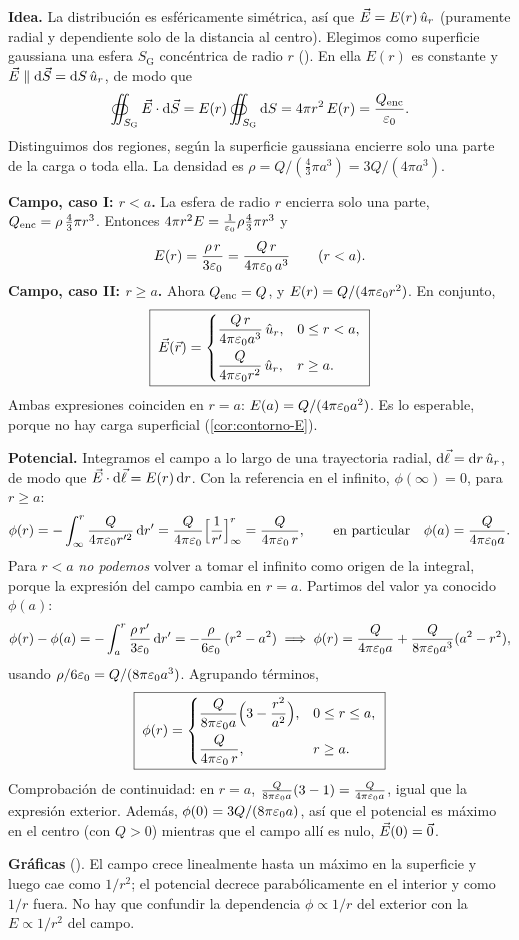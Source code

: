 \begin{resolucion}
\textbf{Idea.} La distribución es esféricamente simétrica, así que $\vec{E}=E(r)\,\hat{u}_{r}$ (puramente radial y dependiente solo de la distancia al centro). Elegimos como superficie gaussiana
una esfera $S_{\mathrm{G}}$ concéntrica de radio $r$ (). En ella $E(r)$ es constante y $\vec{E}\parallel\mathrm{d}\vec{S}=\mathrm{d} S\,\hat{u}_{r}$, de modo que
\[
  \oiint_{S_{\mathrm{G}}}\vec{E}\cdot\mathrm{d}\vec{S}=E(r)\oiint_{S_{\mathrm{G}}}\mathrm{d} S=4\pi r^{2}\,E(r)=\frac{Q_{\mathrm{enc}}}{\varepsilon_{0}}.
\]
Distinguimos dos regiones, según la superficie gaussiana encierre solo una parte de la carga o toda ella. La densidad es $\rho=Q/(\frac43\pi a^{3})=3Q/(4\pi a^{3})$.

\textbf{Campo, caso I: $r<a$.} La esfera de radio $r$ encierra solo una parte, $Q_{\mathrm{enc}}=\rho\,\tfrac43\pi r^{3}$. Entonces $4\pi r^{2}E=\frac{1}{\varepsilon_{0}}\rho\frac43\pi r^{3}$ y
\[
  E(r)=\frac{\rho\,r}{3\varepsilon_{0}}=\frac{Q\,r}{4\pi\varepsilon_{0}\,a^{3}}\qquad(r<a).
\]
\textbf{Campo, caso II: $r\ge a$.} Ahora $Q_{\mathrm{enc}}=Q$, y $E(r)=Q/(4\pi\varepsilon_{0} r^{2})$. En conjunto,
\[
  \boxed{\;\vec{E}(\vec{r})=\begin{cases}\dfrac{Q\,r}{4\pi\varepsilon_{0} a^{3}}\,\hat{u}_{r},&0\le r<a,\\[8pt]\dfrac{Q}{4\pi\varepsilon_{0} r^{2}}\,\hat{u}_{r},&r\ge a.\end{cases}\;}
\]
Ambas expresiones coinciden en $r=a$: $E(a)=Q/(4\pi\varepsilon_{0} a^{2})$. Es lo esperable, porque no hay carga superficial (\cref{cor:contorno-E}).

\textbf{Potencial.} Integramos el campo a lo largo de una trayectoria radial, $\mathrm{d}\vec{\ell}=\mathrm{d} r\,\hat{u}_{r}$, de modo que $\vec{E}\cdot\mathrm{d}\vec{\ell}=E(r)\,\mathrm{d} r$. Con la referencia en el infinito, $\phi(\infty)=0$,
para $r\ge a$:
\[
  \phi(r)=-\int_{\infty}^{r}\frac{Q}{4\pi\varepsilon_{0} r'^{2}}\,\mathrm{d} r'=\frac{Q}{4\pi\varepsilon_{0}}\Bigl[\frac{1}{r'}\Bigr]_{\infty}^{r}=\frac{Q}{4\pi\varepsilon_{0}\,r},\qquad\text{en particular}\quad\phi(a)=\frac{Q}{4\pi\varepsilon_{0} a}.
\]
Para $r<a$ \emph{no podemos} volver a tomar el infinito como origen de la integral, porque la expresión del campo cambia en $r=a$. Partimos del valor ya conocido $\phi(a)$:
\[
  \phi(r)-\phi(a)=-\int_{a}^{r}\frac{\rho\,r'}{3\varepsilon_{0}}\,\mathrm{d} r'=-\frac{\rho}{6\varepsilon_{0}}\,(r^{2}-a^{2})
  \;\Longrightarrow\;
  \phi(r)=\frac{Q}{4\pi\varepsilon_{0} a}+\frac{Q}{8\pi\varepsilon_{0} a^{3}}(a^{2}-r^{2}),
\]
usando $\rho/6\varepsilon_{0}=Q/(8\pi\varepsilon_{0} a^{3})$. Agrupando términos,
\[
  \boxed{\;\phi(r)=\begin{cases}\dfrac{Q}{8\pi\varepsilon_{0} a}\Bigl(3-\dfrac{r^{2}}{a^{2}}\Bigr),&0\le r\le a,\\[8pt]\dfrac{Q}{4\pi\varepsilon_{0}\,r},&r\ge a.\end{cases}\;}
\]
Comprobación de continuidad: en $r=a$, $\frac{Q}{8\pi\varepsilon_{0} a}(3-1)=\frac{Q}{4\pi\varepsilon_{0} a}$, igual que la expresión exterior. Además, $\phi(0)=3Q/(8\pi\varepsilon_{0} a)$, así que el potencial es máximo en el centro (con $Q>0$) mientras que
el campo allí es nulo, $\vec{E}(0)=\vec{0}$.

\textbf{Gráficas} (). El campo crece linealmente hasta un máximo en la superficie y luego cae como $1/r^{2}$; el potencial decrece parabólicamente en el interior y como $1/r$ fuera. No hay que confundir la dependencia
$\phi\propto1/r$ del exterior con la $E\propto1/r^{2}$ del campo.
\end{resolucion}

